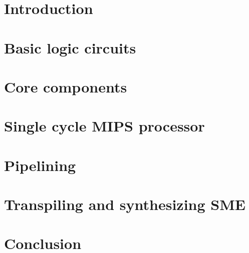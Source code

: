 \documentclass[a4paper]{article}
\begin{document}

\section{Introduction}


%

\section{Basic logic circuits}
\label{sec:logic-circuits}


\section{Core components}
\label{sec:components}


\section{Single cycle MIPS processor}
\label{sec:single-cycle}


\section{Pipelining}
\label{sec:pipelining}


\section{Transpiling and synthesizing SME}
\label{sec:synthesis}


\newpage
\section{Conclusion}

\end{document}
